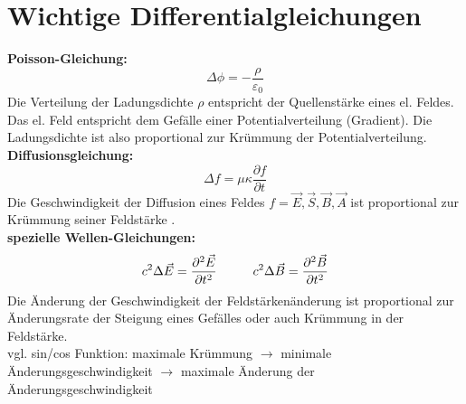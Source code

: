 \documentclass[german]{latex4ei/latex4ei_sheet}
\begin{document}
\section{Wichtige Differentialgleichungen}
\begin{sectionbox}
    \textbf{Poisson-Gleichung:}\\
    \begin{equation*}
        \Delta \phi = -\frac{\rho}{\varepsilon_0}
    \end{equation*}
    Die Verteilung der Ladungsdichte $\rho$ entspricht der Quellenstärke eines el. Feldes.
    Das el. Feld entspricht dem Gefälle einer Potentialverteilung (Gradient). Die Ladungsdichte ist also proportional zur Krümmung der Potentialverteilung.\vspace{2mm} \\
    \textbf{Diffusionsgleichung:}\\
    \begin{equation*}
        \Delta f = \mu \kappa \frac{\partial f}{\partial t}
    \end{equation*}
    Die Geschwindigkeit der Diffusion eines Feldes $f = \vec{E}, \vec{S}, \vec{B}, \vec{A}$ ist proportional zur Krümmung seiner Feldstärke .\vspace{2mm}\\
    \textbf{spezielle Wellen-Gleichungen:}\\
    \begin{equation*}
        c^2 \Delta \vec{E} = \frac{\partial^2 \vec{E}}{\partial t^2}  \hspace{10mm}  c^2 \Delta \vec{B} = \frac{\partial^2 \vec{B}}{\partial t^2}
    \end{equation*}
    Die Änderung der Geschwindigkeit der Feldstärkenänderung ist proportional zur Änderungsrate der Steigung eines Gefälles oder auch Krümmung in der Feldstärke.\\
    vgl. sin/cos Funktion: maximale Krümmung $\rightarrow$ minimale Änderungsgeschwindigkeit $\rightarrow$ maximale Änderung der Änderungsgeschwindigkeit\\
\end{sectionbox}
\end{document}
